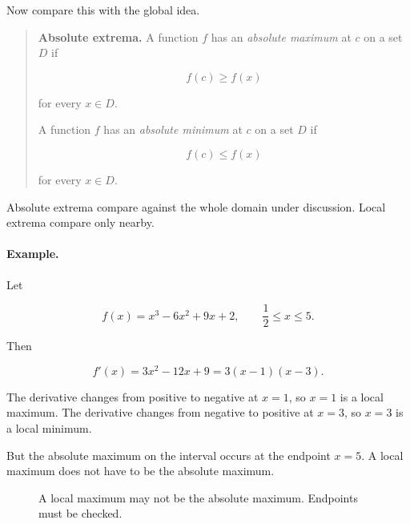 Now compare this with the global idea.

\begin{quote}
\textbf{Absolute extrema.}
A function \(f\) has an \emph{absolute maximum} at \(c\) on a set \(D\) if

\[
f(c)\ge f(x)
\]

for every \(x\in D\).

A function \(f\) has an \emph{absolute minimum} at \(c\) on a set \(D\) if

\[
f(c)\le f(x)
\]

for every \(x\in D\).
\end{quote}

Absolute extrema compare against the whole domain under discussion.  Local extrema
compare only nearby.

\paragraph{Example.}
Let

\[
f(x)=x^3-6x^2+9x+2,
\qquad \frac12\le x\le 5.
\]

Then

\[
f'(x)=3x^2-12x+9=3(x-1)(x-3).
\]

The derivative changes from positive to negative at \(x=1\), so \(x=1\) is a local
maximum.  The derivative changes from negative to positive at \(x=3\), so \(x=3\)
is a local minimum.

But the absolute maximum on the interval occurs at the endpoint \(x=5\).  A
local maximum does not have to be the absolute maximum.

\begin{figure}[h]
\centering
{}
\caption{A local maximum may not be the absolute maximum.  Endpoints must be checked.}
\label{fig:local-vs-absolute-extrema}
\end{figure}

